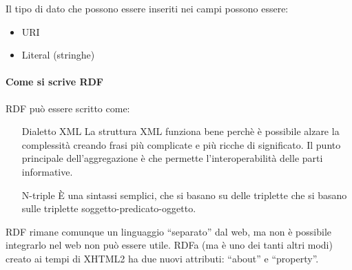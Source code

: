 Il tipo di dato che possono essere inseriti nei campi possono essere:
\begin{itemize}

\item URI
\item Literal (stringhe)

\end{itemize}

\paragraph*{Come si scrive RDF}RDF pu\`o essere scritto come:
\begin{itemize}

\item[Dialetto XML] La struttura XML funziona bene perch\`e \`e possibile alzare la complessit\`a creando frasi pi\`u complicate e pi\`u ricche di significato. Il punto principale dell'aggregazione \`e che permette l'interoperabilit\`a delle parti informative.
\item[N-triple] \`E una sintassi semplici, che si basano su delle triplette che si basano sulle triplette soggetto-predicato-oggetto.

\end{itemize}


RDF rimane comunque un linguaggio ``separato'' dal web, ma non \`e possibile integrarlo nel web non pu\`o essere utile. RDFa (ma \`e uno dei tanti altri modi) creato ai tempi di XHTML2 ha due nuovi attributi: ``about'' e ``property''.

